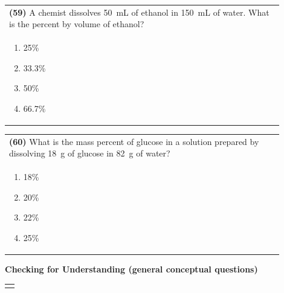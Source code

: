 \documentclass{article}
\begin{document}
{{\vspace{0.2cm}
\noindent\begin{tabular}{|p{0.9\linewidth}|}
\hline
\textbf{(59)} A chemist dissolves 50~mL of ethanol in 150~mL of water. What is the percent by volume of ethanol?\\[0.2cm]
\begin{minipage}[t]{0.85\linewidth}
\begin{enumerate}[label=\alph*.]
\item 25\%
\item 33.3\%
\item 50\%
\item 66.7\%
\end{enumerate}
\end{minipage}\\[0.2cm]
\hline
\end{tabular}

\vspace{0.2cm}
\noindent\begin{tabular}{|p{0.9\linewidth}|}
\hline
\textbf{(60)} What is the mass percent of glucose in a solution prepared by dissolving 18~g of glucose in 82~g of water?\\[0.2cm]
\begin{minipage}[t]{0.85\linewidth}
\begin{enumerate}[label=\alph*.]
\item 18\%
\item 20\%
\item 22\%
\item 25\%
\end{enumerate}
\end{minipage}\\[0.2cm]
\hline
\end{tabular}

\newpage
{\large\textbf{Checking for Understanding (general conceptual questions)}}\\
\noindent \begin{tabular}{|p{0.9\linewidth}|}
\hline
\vspace{0.2cm}


\end{tabular}}}
\end{document}
